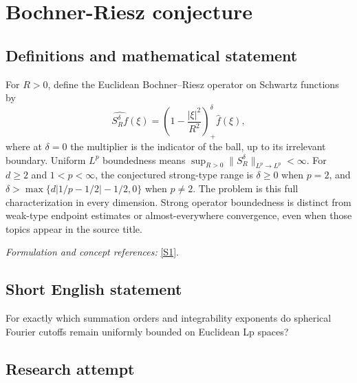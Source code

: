 \documentclass[11pt,a4paper]{article}
\newcommand{\sref}[2]{\hyperlink{source:#1:#2}{[S#2]}}
\newif\ifshowcatalogue
\newcommand{\cataloguescope}[1]{\ifshowcatalogue
 \paragraph{Exact scope in the supplied catalogue.}
 \begin{quote}\small #1\end{quote}\fi}
\numberwithin{equation}{section}
\begin{document}
\setcounter{section}{179}
\clearpage
\section{\texorpdfstring{Bochner-Riesz conjecture}{Bochner-Riesz conjecture}}\label{180}
\subsection{Definitions and mathematical statement}
For $R>0$, define the Euclidean Bochner--Riesz operator on Schwartz functions by
\[
 \widehat{S_R^\delta f}(\xi)=\left(1-\frac{|\xi|^2}{R^2}\right)_+^\delta\widehat f(\xi),
\]
where at $\delta=0$ the multiplier is the indicator of the ball, up to its irrelevant boundary. Uniform $L^p$ boundedness means
$\sup_{R>0}\|S_R^\delta\|_{L^p\to L^p}<\infty$.
For $d\ge2$ and $1<p<\infty$, the conjectured strong-type range is $\delta\ge0$ when $p=2$, and
$\delta>\max\{d|1/p-1/2|-1/2,0\}$ when $p\ne2$.
The problem is this full characterization in every dimension. Strong operator boundedness is distinct from weak-type endpoint estimates or almost-everywhere convergence, even when those topics appear in the source title.
\par\smallskip\textit{Formulation and concept references:} \sref{180}{1}.
\cataloguescope{Prove the sharp conjectured characterization of all orders delta greater than or equal to zero and exponents 1<p<infinity for which the Euclidean Bochner-Riesz means are uniformly bounded on L\textasciicircum{}p(R\textasciicircum{}d), in every dimension d at least 2.}
\subsection{Short English statement}
For exactly which summation orders and integrability exponents do spherical Fourier cutoffs remain uniformly bounded on Euclidean Lp spaces?
\subsection{Research attempt}
\end{document}
